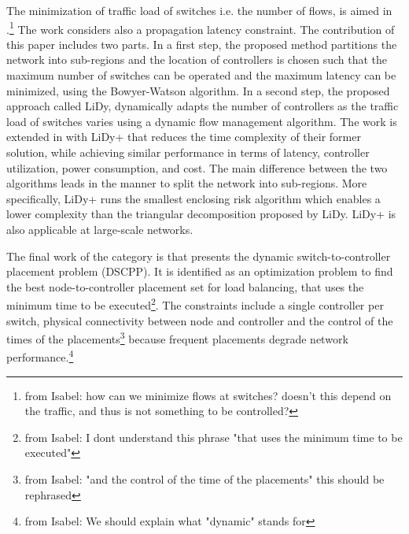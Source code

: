 \documentclass{IEEEtran}
\newcommand\fia[1]{{\color{red}\footnote{\color{red}from Isabel: #1}}} %
\newcommand\delia[1]{{\tiny{\color{red}#1}}} %
\begin{document}
The minimization of traffic load of switches i.e. the number of flows, is aimed in \cite{HuJo15}.\fia{how can we minimize flows at switches? doesn't this depend on the traffic, and thus is not something to be controlled?} The work considers also a propagation latency constraint. The contribution of this paper includes two parts. In a first step, the proposed method partitions the network into sub-regions and the location of controllers is chosen such that the maximum number of switches can be operated and the maximum latency can be minimized,  using the Bowyer-Watson algorithm. In a second step, the proposed approach called LiDy, dynamically adapts the number of controllers as the traffic load of switches varies using a dynamic flow management algorithm. %
The work is extended in \cite{HuSi17} with LiDy+ that reduces the time complexity of their former solution, while achieving similar performance in terms of latency, controller utilization, power consumption, and cost. The main difference between the two algorithms leads in the manner to split the network into sub-regions. More specifically, LiDy+ runs the smallest enclosing risk algorithm which enables a lower complexity than the triangular decomposition proposed by LiDy. LiDy+ is also applicable at large-scale networks.

\delia{The final work of the category is}  \cite{LiYo16} \delia{that} presents the dynamic switch-to-controller placement problem (DSCPP). It is identified as an optimization problem to find the best node-to-controller placement set for load balancing, that uses the minimum time to be executed\fia{I dont understand this phrase "that uses the minimum time to be executed"}. The constraints include a single controller per switch, physical connectivity between node and controller and the control of the times of the placements\fia{"and the control of the time of the placements" this should be rephrased} because frequent placements degrade network performance.\fia{We should explain what "dynamic" stands for}%
\end{document}
